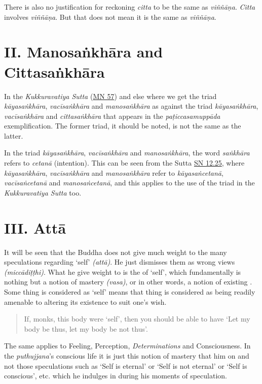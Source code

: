 There is also no justification for reckoning \emph{citta} to be the same as \emph{viññāṇa}. \emph{Citta} involves \emph{viññāṇa}. But that does not mean it is the same as \emph{viññāṇa}.

\section{II. Manosaṅkhāra and Cittasaṅkhāra}

In the \emph{Kukkuravatiya Sutta} (\href{https://suttacentral.net/mn57/en/bodhi}{MN 57}) and else where we get the triad \emph{kāyasaṅkhāra}, \emph{vacīsaṅkhāra} and \emph{manosaṅkhāra} as against the triad \emph{kāyasaṅkhāra}, \emph{vacīsaṅkhāra} and \emph{cittasaṅkhāra} that appears in the \emph{paṭiccasamuppāda} exemplification. The former triad, it should be noted, is not the same as the latter.

In the triad \emph{kāyasaṅkhāra}, \emph{vacīsaṅkhāra} and \emph{manosaṅkhāra}, the word \emph{saṅkhāra} refers to \emph{cetanā} (intention). This can be seen from the Sutta \href{https://suttacentral.net/sn12.25/en/bodhi}{SN 12.25}, where \emph{kāyasaṅkhāra}, \emph{vacīsaṅkhāra} and \emph{manosaṅkhāra} refer to \emph{kāyasaṅcetanā}, \emph{vacīsaṅcetanā} and \emph{manosaṅcetanā}, and this applies to the use of the triad in the \emph{Kukkuravatiya Sutta} too.

\section{III. Attā}

It will be seen that the Buddha does not give much weight to the many speculations regarding `self' \emph{(attā)}. He just dismisses them as wrong views \emph{(miccādiṭṭhi)}. What he  give weight to is the  of `self', which fundamentally is nothing but a notion of mastery \emph{(vasa)}, or in other words, a notion of existing . Some thing is considered as `self' means that thing is considered as being readily amenable to altering its existence to suit one's wish.

\begin{quote}
If, monks, this body were `self', then you should be able to have `Let my body be thus, let my body be not thus'.
\end{quote}

The same applies to Feeling, Perception, \emph{Determinations} and Consciousness. In the \emph{puthujjana}'s conscious life it is just this notion of mastery that  him on and not those speculations such as `Self is eternal' or `Self is not eternal' or `Self is conscious', etc. which he indulges in during his moments of speculation.

